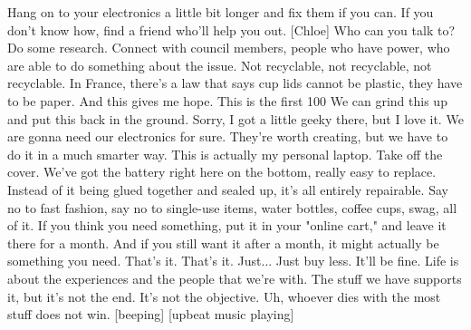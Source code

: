 \documentclass[a4paper]{article}
\begin{document}
	Hang on to your electronics a little bit longer and fix them if you can.
	If you don't know how, find a friend who'll help you out.
	[Chloe] Who can you talk to? Do some research.
	Connect with council members, people who have power,
	who are able to do something about the issue.
	Not recyclable, not recyclable, not recyclable.
	In France, there's a law that says
	cup lids cannot be plastic, they have to be paper.
	And this gives me hope.
	This is the first 100%
	We can grind this up and put this back in the ground.
	Sorry, I got a little geeky there, but I love it.
	We are gonna need our electronics for sure.
	They're worth creating, but we have to do it in a much smarter way.
	This is actually my personal laptop.
	Take off the cover.
	We've got the battery right here on the bottom,
	really easy to replace.
	Instead of it being glued together and sealed up,
	it's all entirely repairable.
	Say no to fast fashion, say no to single-use items,
	water bottles, coffee cups,
	swag, all of it.
	If you think you need something, put it in your "online cart,"
	and leave it there for a month.
	And if you still want it after a month, it might actually be something you need.
	That's it. That's it. Just... Just buy less.
	It'll be fine.
	Life is about the experiences and the people that we're with.
	The stuff we have supports it, but it's not the end.
	It's not the objective.
	Uh, whoever dies with the most stuff does not win.
	[beeping]
	[upbeat music playing]
	
	

	
\end{document}
